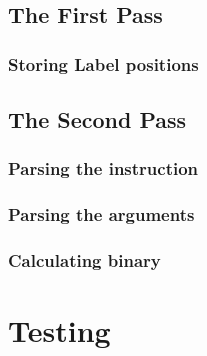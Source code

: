 \documentclass[journal,12pt,onecolumn]{IEEEtran}
\theoremstyle{remark}
\begin{document}
		\subsection{The First Pass}

			\subsubsection{Storing Label positions}


		\subsection{The Second Pass}

			\subsubsection{Parsing the instruction}

			\subsubsection{Parsing the arguments}

			\subsubsection{Calculating binary}


	\section{Testing}
	
\end{document}
